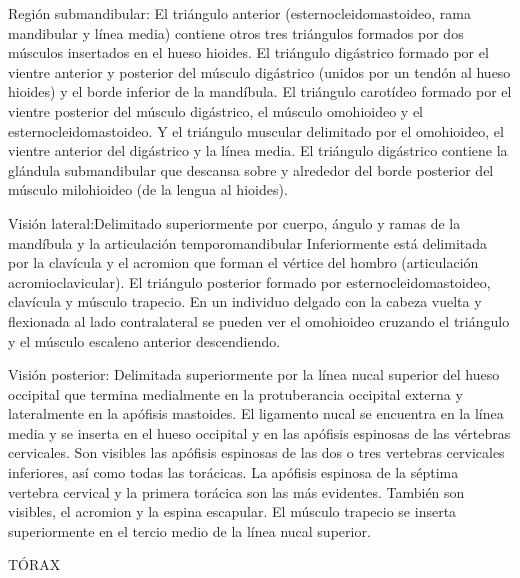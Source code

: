 Región submandibular: El triángulo anterior (esternocleidomastoideo, rama mandibular y línea media) contiene otros tres triángulos formados por dos músculos insertados en el hueso hioides. El triángulo digástrico formado por el vientre anterior y posterior del músculo digástrico (unidos por un tendón al hueso hioides) y el borde inferior de la mandíbula. El triángulo carotídeo formado por el vientre posterior del músculo digástrico, el músculo omohioideo y el esternocleidomastoideo. Y el triángulo muscular delimitado por el omohioideo, el vientre anterior del digástrico y la línea media. El triángulo digástrico contiene la glándula submandibular que descansa sobre y alrededor del borde posterior del músculo milohioideo (de la lengua al hioides). 

Visión lateral:Delimitado superiormente por cuerpo, ángulo y ramas de la mandíbula y la articulación temporomandibular Inferiormente está delimitada por la clavícula y el acromion que forman el vértice del hombro (articulación acromioclavicular).
El triángulo posterior formado por esternocleidomastoideo, clavícula y músculo trapecio. En un individuo delgado con la cabeza vuelta y flexionada al lado contralateral se pueden ver el omohioideo cruzando el triángulo y el músculo escaleno anterior descendiendo.

Visión posterior: Delimitada superiormente por la línea nucal superior del hueso occipital que termina medialmente en la protuberancia occipital externa y lateralmente en la apófisis mastoides.
El ligamento nucal se encuentra en la línea media y se inserta en el hueso occipital y en las apófisis espinosas de las vértebras cervicales. Son visibles las apófisis espinosas de las dos o tres vertebras cervicales inferiores, así como todas las torácicas. La apófisis espinosa de la séptima vertebra cervical  y la primera torácica son las más evidentes. También son visibles, el acromion y la espina escapular.
El músculo trapecio se inserta superiormente en el tercio medio de la línea nucal superior.


TÓRAX

